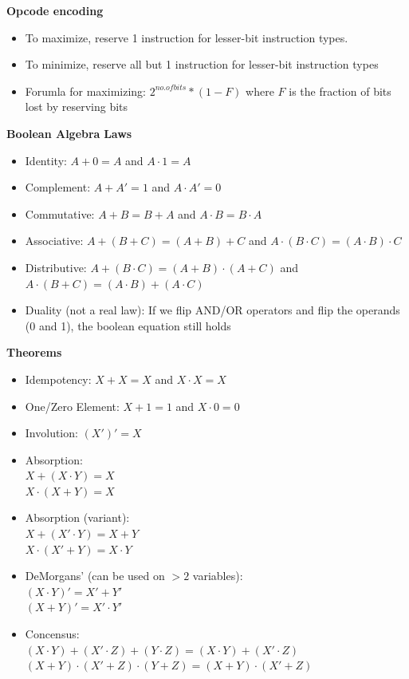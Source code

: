 \documentclass[a4paper]{article} \usepackage[backend=biber, style=numeric, sorting=none]{biblatex}
\begin{document}
\begin{multicols*}{4}
\textbf{Opcode encoding}
\begin{itemize}
\itemsep -0.5em
\item To maximize, reserve 1 instruction for lesser-bit instruction types.
\item To minimize, reserve all but 1 instruction for lesser-bit instruction types
\item Forumla for maximizing: $2^{no. of bits} * (1 - F)$ where $F$ is the fraction of bits lost by reserving bits
\end{itemize}

{\small\textbf{Boolean Algebra}}
\textbf{Laws}
\begin{itemize}
\itemsep -0.5em
\item Identity: $A + 0 = A$ and $A \cdot 1 = A$
\item Complement: $A + A' = 1$ and $A \cdot A' = 0$
\item Commutative: $A + B = B + A$  and $A \cdot B = B \cdot A$
\item Associative: $A + (B + C) = (A + B) + C$ and $A \cdot (B \cdot C) = (A \cdot B) \cdot C$
\item Distributive: $A + (B \cdot C) = (A + B) \cdot (A + C)$ and $A \cdot (B + C) = (A \cdot B) + (A \cdot C)$
\item Duality (not a real law): If we flip AND/OR operators and flip the operands (0 and 1), the boolean equation still holds
\end{itemize}

\textbf{Theorems}
\begin{itemize}
\itemsep -0.5em
\item Idempotency: $X + X = X$ and $X \cdot X = X$
\item One/Zero Element: $X + 1 = 1$ and $X \cdot 0 = 0$
\item Involution: $(X')' = X$ 
\item Absorption: \\ $X + (X \cdot Y) = X$ \\ $X \cdot (X + Y) = X$
\item Absorption (variant): \\ $X + (X' \cdot Y) = X + Y$ \\ $X \cdot (X' + Y) = X \cdot Y$
\item DeMorgans' (can be used on $>2$ variables): \\ $(X \cdot Y)' = X' + Y'$ \\ $(X + Y)' = X' \cdot Y'$
\item Concensus: \\ $(X \cdot Y) + (X' \cdot Z) + (Y \cdot Z) = (X \cdot Y) + (X' \cdot Z)$ \\ $(X + Y) \cdot (X' + Z) \cdot (Y + Z) = (X + Y) \cdot (X' + Z)$
\end{itemize}


\end{multicols*}
\end{document}
